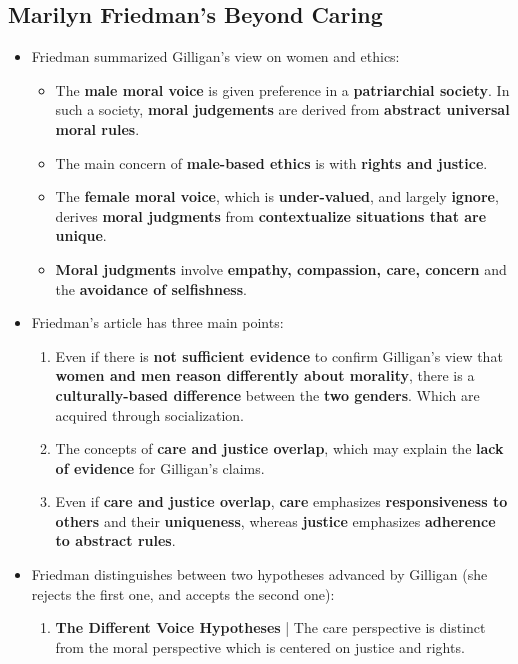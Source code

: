 \documentclass{article}
\begin{document}
    \subsection*{Marilyn Friedman's Beyond Caring}
    \begin{itemize}
        \item Friedman summarized Gilligan's view on women and ethics: 
        \begin{itemize}
            \item The \textbf{male moral voice} is given preference in a \textbf{patriarchial society}. In such a society, \textbf{moral judgements} are derived from \textbf{abstract universal moral rules}.
            \item The main concern of \textbf{male-based ethics} is with \textbf{rights and justice}.
            \item The \textbf{female moral voice}, which is \textbf{under-valued}, and largely \textbf{ignore}, derives \textbf{moral judgments} from \textbf{contextualize situations that are unique}.
            \item \textbf{Moral judgments} involve \textbf{empathy, compassion, care, concern} and the \textbf{avoidance of selfishness}.
        \end{itemize}
        \item Friedman's article has three main points:
        \begin{enumerate}
            \item Even if there is \textbf{not sufficient evidence }to confirm Gilligan's view that \textbf{women and men reason differently about morality}, there is a \textbf{culturally-based difference} between the \textbf{two genders}. Which are acquired through socialization.
            \item The concepts of \textbf{care and justice overlap}, which may explain the \textbf{lack of evidence} for Gilligan's claims.
            \item Even if \textbf{care and justice overlap}, \textbf{care} emphasizes \textbf{responsiveness to others} and their \textbf{uniqueness}, whereas \textbf{justice} emphasizes \textbf{adherence to abstract rules}.
        \end{enumerate}        
        \item Friedman distinguishes between two hypotheses advanced by Gilligan (she rejects the first one, and accepts the second one):
        \begin{enumerate}
            \item \textbf{The Different Voice Hypotheses} | The care perspective is distinct from the moral perspective which is centered on justice and rights.

\end{enumerate}
\end{itemize}
\end{document}
